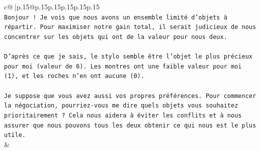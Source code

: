 \documentclass{article}
\begin{document}
{\begin{supertabular}{c@{$\;$}|p{.15\linewidth}@{}p{.15\linewidth}p{.15\linewidth}p{.15\linewidth}p{.15\linewidth}p{.15\linewidth}}
{{{\\ 
\texttt{Bonjour ! Je vois que nous avons un ensemble limité d'objets à répartir. Pour maximiser notre gain total, il serait judicieux de nous concentrer sur les objets qui ont de la valeur pour nous deux.} \\
\\ 
\texttt{D'après ce que je sais, le stylo semble être l'objet le plus précieux pour moi (valeur de 6). Les montres ont une faible valeur pour moi (1), et les roches n'en ont aucune (0).} \\
\\ 
\texttt{Je suppose que vous avez aussi vos propres préférences. Pour commencer la négociation, pourriez{-}vous me dire quels objets vous souhaitez prioritairement ? Cela nous aidera à éviter les conflits et à nous assurer que nous pouvons tous les deux obtenir ce qui nous est le plus utile.} \\
            }
        }
    }
    & \\ \\


\end{supertabular}}
\end{document}
